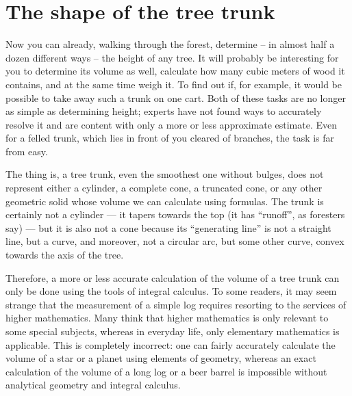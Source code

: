 \section{The shape of the tree trunk}
\label{sec-1.10}

Now you can already, walking through the forest, determine -- in almost half a dozen different ways -- the height of any tree. It will probably be interesting for you to determine its volume as well, calculate how many cubic meters of wood it contains, and at the same time weigh it. To find out if, for example, it would be possible to take away such a trunk on one cart. Both of these tasks are no longer as simple as determining height; experts have not found ways to accurately resolve it and are content with only a more or less approximate estimate. Even for a felled trunk, which lies in front of you cleared of branches, the task is far from easy.

The thing is, a tree trunk, even the smoothest one without bulges, does not represent either a cylinder, a complete cone, a truncated cone, or any other geometric solid whose volume we can calculate using formulas. The trunk is certainly not a cylinder — it tapers towards the top (it has ``runoff'', as foresters say) — but it is also not a cone because its ``generating line'' is not a straight line, but a curve, and moreover, not a circular arc, but some other curve, convex towards the axis of the tree.

Therefore, a more or less accurate calculation of the volume of a tree trunk can only be done using the tools of integral calculus. To some readers, it may seem strange that the measurement of a simple log requires resorting to the services of higher mathematics. Many think that higher mathematics is only relevant to some special subjects, whereas in everyday life, only elementary mathematics is applicable. This is completely incorrect: one can fairly accurately calculate the volume of a star or a planet using elements of geometry, whereas an exact calculation of the volume of a long log or a beer barrel is impossible without analytical geometry and integral calculus.

